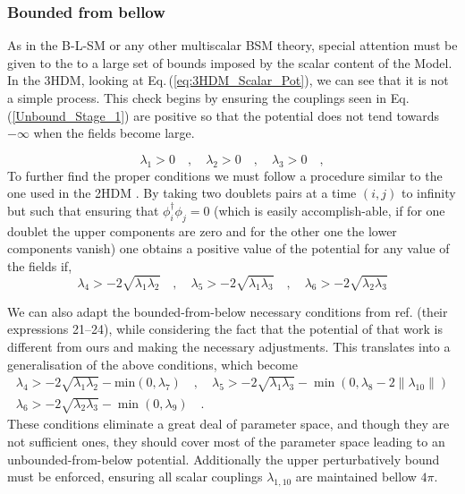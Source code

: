 \subsubsection{Bounded from bellow}

As in the B-L-SM or any other multiscalar BSM theory, special attention must be given to the to a large set of bounds imposed by the scalar content of the Model. 
%
In the 3HDM, looking at Eq.\,(\ref{eq:3HDM_Scalar_Pot}), we can see that it is not a simple process. This check begins by ensuring the couplings seen in Eq.\,(\ref{Unbound_Stage_1}) are positive so that the potential does not tend towards $-\infty$ when the fields become large. 

\begin{equation}
\label{Unbound_Stage_1}
\lambda_1 > 0  \quad , \quad \lambda_2 > 0 \quad , \quad \lambda_3 > 0 \quad , 
\end{equation}
%
To further find the proper conditions we must follow a procedure similar to the one used in the 2HDM \cite{Branco_1996}.
%
By taking two doublets pairs at a time $(i, j)$ to infinity but such that ensuring that $\phi_i^\dagger \phi_j = 0$ (which is easily accomplish-able, if for one doublet the upper components are zero and for the other one the lower components vanish) one obtains a positive value of the potential for any value of the fields if,
%
\begin{equation}
\lambda_4 > -2 \sqrt{\lambda_1 \lambda_2} \quad , \quad \lambda_5 > -2 \sqrt{\lambda_1 \lambda_3} \quad , \quad \lambda_6 > -2 \sqrt{\lambda_2 \lambda_3}
\end{equation}
%

We can also adapt the bounded-from-below necessary conditions from ref. \cite{Moretti_2015} (their expressions 21–24), while considering the fact that the potential of that work is different from ours and making the necessary adjustments.
%
This translates into a generalisation of the above conditions, which become
%
\begin{equation}
\begin{gathered}
\lambda_4 > - 2 \sqrt{\lambda_1 \lambda_2} - \text{min}(0,\lambda_7) \quad , \quad  \lambda_5 > -2 \sqrt{\lambda_1 \lambda_3} - \min(0,\lambda_8 - 2\|\lambda_{10}\|)  \\
\lambda_6 > - 2 \sqrt{\lambda_2 \lambda_3} - \min(0,\lambda_9) \quad . 
\end{gathered} 
\end{equation}
%
These conditions eliminate a great deal of parameter space, and though they are not sufficient ones, they should cover most of the parameter space leading to an unbounded-from-below potential.
% 
Additionally the upper perturbatively bound must be enforced, ensuring all scalar couplings $\lambda_{1,10}$ are maintained bellow $4\pi$.

